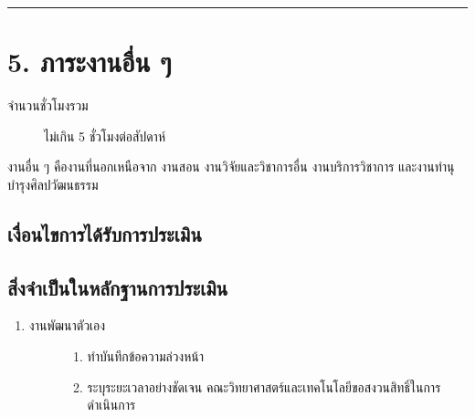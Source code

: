 \documentclass[a4paper,12pt,english]{sphinxmanual}
\begin{document}
\bigskip\hrule\bigskip



\chapter{5. ภาระงานอื่น ๆ}
\label{\detokenize{5etc:id1}}\label{\detokenize{5etc::doc}}\begin{description}
\item[{จำนวนชั่วโมงรวม}] \leavevmode
ไม่เกิน 5 ชั่วโมงต่อสัปดาห์

\end{description}

งานอื่น ๆ คืองานที่นอกเหนือจาก งานสอน งานวิจัยและวิชาการอื่น งานบริการวิชาการ และงานทำนุบำรุงศิลปวัฒนธรรม


\section{เงื่อนไขการได้รับการประเมิน}
\label{\detokenize{5etc:id2}}

\section{สิ่งจำเป็นในหลักฐานการประเมิน}
\label{\detokenize{5etc:id3}}\begin{enumerate}
%
\item {} \begin{description}
\item[{งานพัฒนาตัวเอง}] \leavevmode\begin{enumerate}
%
\item {} 
 ทำบันทึกข้อความล่วงหน้า

\item {} 
 ระบุระยะเวลาอย่างชัดเจน คณะวิทยาศาสตร์และเทคโนโลยีขอสงวนสิทธิ์ในการดำเนินการ

\end{enumerate}

\end{description}

\end{enumerate}
\end{document}
